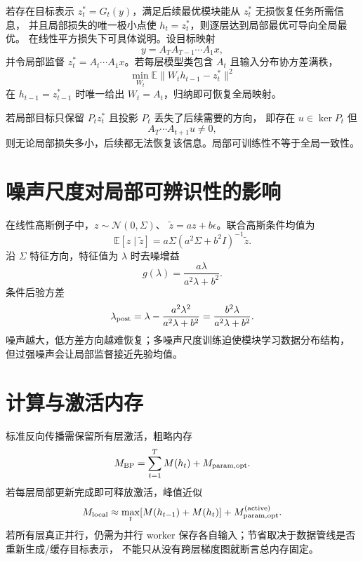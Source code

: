 \documentclass[11pt]{article}
\numberwithin{equation}{section}
\newcommand{\E}{\mathbb{E}}
\newcommand{\1}{\mathbf{1}}
\newcommand{\cN}{\mathcal{N}}
\begin{document}
若存在目标表示 $z_t^*=G_t(y)$，满足后续最优模块能从 $z_t^*$ 无损恢复任务所需信息，
并且局部损失的唯一极小点使 $h_t=z_t^*$，则逐层达到局部最优可导向全局最优。
在线性平方损失下可具体说明。设目标映射
\begin{equation}
 y=A_TA_{T-1}\cdots A_1x,
\end{equation}
并令局部监督 $z_t^*=A_t\cdots A_1x$。若每层模型类包含 $A_t$ 且输入分布协方差满秩，
\begin{equation}
 \min_{W_t}\E\|W_th_{t-1}-z_t^*\|^2
\end{equation}
在 $h_{t-1}=z_{t-1}^*$ 时唯一给出 $W_t=A_t$，归纳即可恢复全局映射。

若局部目标只保留 $P_tz_t^*$ 且投影 $P_t$ 丢失了后续需要的方向，
即存在 $u\in\ker P_t$ 但
\begin{equation}
 A_T\cdots A_{t+1}u\ne0,
\end{equation}
则无论局部损失多小，后续都无法恢复该信息。局部可训练性不等于全局一致性。

\section{噪声尺度对局部可辨识性的影响}

在线性高斯例子中，$z\sim\cN(0,\Sigma)$、
$\widetilde z=az+b\epsilon$。联合高斯条件均值为
\begin{equation}
 \E[z\mid\widetilde z]
 =a\Sigma(a^2\Sigma+b^2I)^{-1}\widetilde z.
\end{equation}
沿 $\Sigma$ 特征方向，特征值为 $\lambda$ 时去噪增益
\begin{equation}
 g(\lambda)=\frac{a\lambda}{a^2\lambda+b^2}.
\end{equation}
条件后验方差
\begin{equation}
 \lambda_{\rm post}=
 \lambda-\frac{a^2\lambda^2}{a^2\lambda+b^2}
 =\frac{b^2\lambda}{a^2\lambda+b^2}.
\end{equation}
噪声越大，低方差方向越难恢复；多噪声尺度训练迫使模块学习数据分布结构，
但过强噪声会让局部监督接近先验均值。

\section{计算与激活内存}

标准反向传播需保留所有层激活，粗略内存
\begin{equation}
 M_{\rm BP}=\sum_{t=1}^{T}M(h_t)+M_{\rm param,opt}.
\end{equation}
若每层局部更新完成即可释放激活，峰值近似
\begin{equation}
 M_{\rm local}\approx\max_t[M(h_{t-1})+M(h_t)]
 +M_{\rm param,opt}^{(\rm active)}.
\end{equation}
若所有层真正并行，仍需为并行 worker 保存各自输入；节省取决于数据管线是否重新生成/缓存目标表示，
不能只从没有跨层梯度图就断言总内存固定。
\end{document}
